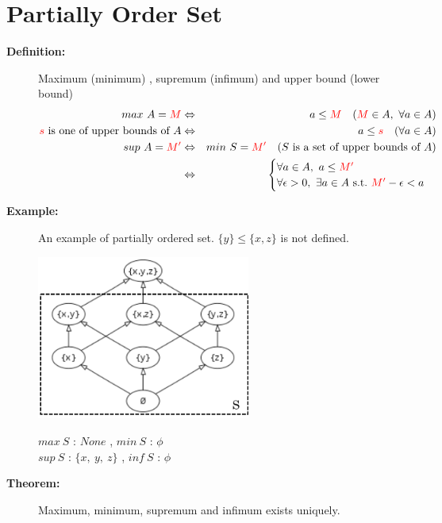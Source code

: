 \documentclass[english,dvipdfmx]{jsarticle}
\begin{document}
\section{Partially Order Set}
\begin{description}
    \item[\bf{Definition:}] Maximum (minimum) , supremum (infimum) and upper bound (lower bound)
    \begin{eqnarray*}
    max \ A = {\color{red}M}  &\Leftrightarrow& a \leq {\color{red}M} \quad ( {\color{red}M} \in A ,\ \forall a \in A )  \\
    {\color{red}{s}} \text{ is one of upper bounds of } A &\Leftrightarrow& a \leq {\color{red}{s}} \quad ( \forall a \in A ) \\
    sup \ A = {\color{red}M'} &\Leftrightarrow& min \ S = {\color{red}M'} \quad ( S \text{ is a set of upper bounds of }A ) \\
    &\Leftrightarrow& \begin{cases}  \forall a \in A  ,\ a \leq {\color{red}M'} \\ \forall \epsilon > 0 ,\ \exists a \in A \ \text{s.t.} \ {\color{red}M'} - \epsilon < a \end{cases}
    \end{eqnarray*}
    \item[\bf{Example:}] An example of partially ordered set. $ \{ y \} \leq \{ x,z \} $ is not defined. \\
        \begin{minipage}{.4\textwidth}
            \centering\includegraphics[width=7cm]{./set.png}
            \end{minipage}
            \hfill
            \begin{minipage}{.4\textwidth}
        $max \ S$ : $None$ , $min \ S$ : $\phi$\\
        $sup \ S$ : $\{ x,\ y,\ z \}$ , $inf \ S$ : $\phi$
        \end{minipage}
    \item[\bf{Theorem:}] Maximum, minimum, supremum and infimum exists uniquely.\\

\end{description}
\end{document}
